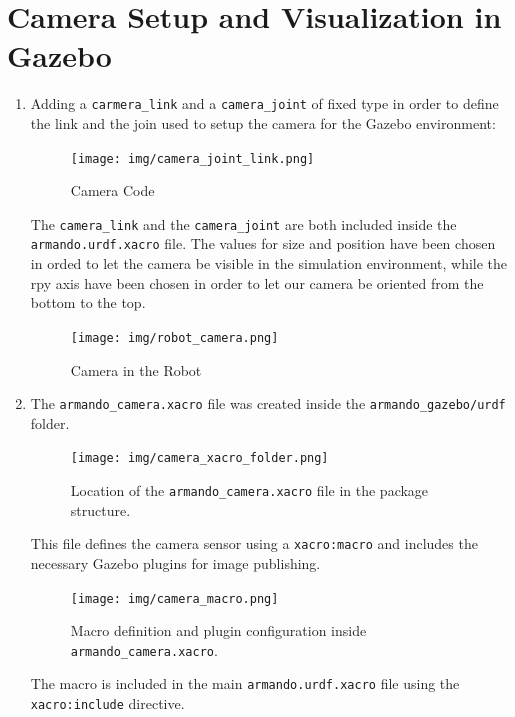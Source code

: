 \documentclass{article}
\begin{document}
\section{Camera Setup and Visualization in Gazebo}
\begin{enumerate}
\item Adding a \lstinline{carmera_link} and a \lstinline{camera_joint} of fixed type in order to define the link and the join used to setup the camera for the Gazebo environment:

        \begin{figure}[H]
        \centering
        \texttt{[image: img/camera\_joint\_link.png]}
        \label{fig:camera_joint_link}
        \caption{Camera Code}
    \end{figure}

\noindent The \lstinline{camera_link} and the \lstinline{camera_joint} are both included inside the \lstinline{armando.urdf.xacro} file. The values for size and position have been chosen in orded to let the camera be visible in the simulation environment, while the rpy axis have been chosen in order to let our camera be oriented from the bottom to the top.

        \begin{figure}[H]
        \centering
        \texttt{[image: img/robot\_camera.png]}
        \label{fig:robot_camera}
        \caption{Camera in the Robot}
        \end{figure}

\item The \lstinline{armando_camera.xacro} file was created inside the \lstinline{armando_gazebo/urdf} folder.

\begin{figure}[H]
    \centering
    \texttt{[image: img/camera\_xacro\_folder.png]}
    \caption{Location of the \texttt{armando\_camera.xacro} file in the package structure.}
    \label{fig:camera_xacro_folder}
\end{figure}

\noindent This file defines the camera sensor using a \lstinline{xacro:macro} and includes the necessary Gazebo plugins for image publishing.

\begin{figure}[H]
    \centering
    \texttt{[image: img/camera\_macro.png]}
    \caption{Macro definition and plugin configuration inside \texttt{armando\_camera.xacro}.}
    \label{fig:camera_macro}
\end{figure}

\noindent The macro is included in the main \lstinline{armando.urdf.xacro} file using the \lstinline{xacro:include} directive.


\end{enumerate}
\end{document}

